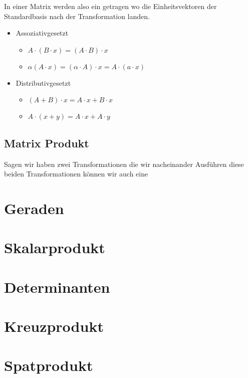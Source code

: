 \noindent In einer Matrix werden also ein getragen wo die Einheitsvektoren der Standardbasis nach der Transformation landen.

\begin{itemize}
	\item Assoziativgesetzt 
	\begin{itemize}
		\item $ A \cdot ( B \cdot x ) = ( A \cdot B ) \cdot x $
		\item $ \alpha ( A \cdot x ) = ( \alpha \cdot A ) \cdot x = A \cdot (a \cdot x) $
	\end{itemize}	 
	\item Distributivgesetzt
	\begin{itemize}
		\item $ ( A + B ) \cdot x = A \cdot x + B \cdot x $
		\item $ A \cdot ( x + y ) = A \cdot x + A \cdot y $
	\end{itemize}	
\end{itemize}

\subsection{Matrix Produkt}

Sagen wir haben zwei Transformationen die wir nacheinander Ausführen diese beiden Transformationen können wir auch eine 




\section{Geraden}

\section{Skalarprodukt}

\section{Determinanten}

\section{Kreuzprodukt}

\section{Spatprodukt}

